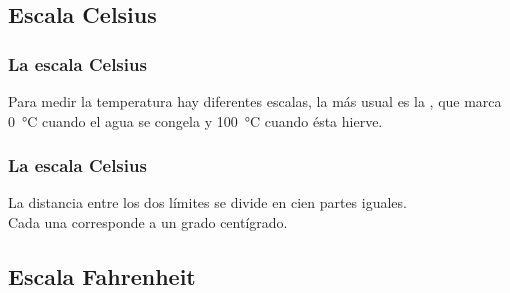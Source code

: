\documentclass[14pt]{beamer}
\begin{document}
\subsection{Escala Celsius}

\begin{frame}
\frametitle{La escala Celsius}
Para medir la temperatura hay diferentes escalas, la más usual es la , \pause que marca \SI{0}{\degreeCelsius} cuando el agua se congela y \SI{100}{\degreeCelsius} cuando ésta hierve.
\end{frame}
\begin{frame}
\frametitle{La escala Celsius}
La distancia entre los dos límites se divide en cien partes iguales. 
\\
\bigskip
\pause
Cada una corresponde a un grado centígrado.
\end{frame}

\subsection{Escala Fahrenheit}
\end{document}
